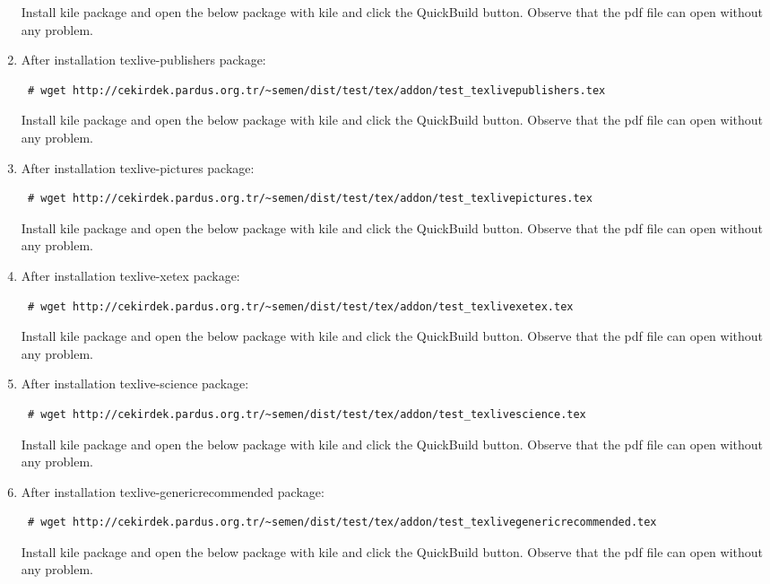 \documentclass[a4paper,10pt]{article}
\begin{document}
\begin{enumerate}
Install kile package and open the below package with kile and click the QuickBuild button. Observe that the pdf file can open without any problem.
\item After installation texlive-publishers package:
\begin{verbatim}
 # wget http://cekirdek.pardus.org.tr/~semen/dist/test/tex/addon/test_texlivepublishers.tex
\end{verbatim}

Install kile package and open the below package with kile and click the QuickBuild button. Observe that the pdf file can open without any problem.

\item After installation texlive-pictures package:
\begin{verbatim}
 # wget http://cekirdek.pardus.org.tr/~semen/dist/test/tex/addon/test_texlivepictures.tex
\end{verbatim}

Install kile package and open the below package with kile and click the QuickBuild button. Observe that the pdf file can open without any problem.

\item After installation texlive-xetex package:
\begin{verbatim}
 # wget http://cekirdek.pardus.org.tr/~semen/dist/test/tex/addon/test_texlivexetex.tex
\end{verbatim}

Install kile package and open the below package with kile and click the QuickBuild button. Observe that the pdf file can open without any problem.
\item After installation texlive-science package:
\begin{verbatim}
 # wget http://cekirdek.pardus.org.tr/~semen/dist/test/tex/addon/test_texlivescience.tex
\end{verbatim}

Install kile package and open the below package with kile and click the QuickBuild button. Observe that the pdf file can open without any problem.

\item After installation texlive-genericrecommended package:
\begin{verbatim}
 # wget http://cekirdek.pardus.org.tr/~semen/dist/test/tex/addon/test_texlivegenericrecommended.tex
\end{verbatim}

Install kile package and open the below package with kile and click the QuickBuild button. Observe that the pdf file can open without any problem.


\end{enumerate}
\end{document}
